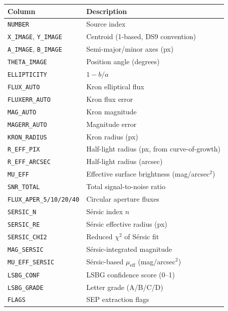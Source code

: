 \documentclass[11pt,fleqn]{book}
\begin{document}
\begin{center}
\begin{longtable}{L{3.5cm} L{9cm}}
\toprule
\textbf{Column} & \textbf{Description} \\
\midrule
\endhead
\texttt{NUMBER} & Source index \\
\texttt{X\_IMAGE}, \texttt{Y\_IMAGE} & Centroid (1-based, DS9 convention) \\
\texttt{A\_IMAGE}, \texttt{B\_IMAGE} & Semi-major/minor axes (px) \\
\texttt{THETA\_IMAGE} & Position angle (degrees) \\
\texttt{ELLIPTICITY} & $1 - b/a$ \\
\midrule
\texttt{FLUX\_AUTO} & Kron elliptical flux \\
\texttt{FLUXERR\_AUTO} & Kron flux error \\
\texttt{MAG\_AUTO} & Kron magnitude \\
\texttt{MAGERR\_AUTO} & Magnitude error \\
\texttt{KRON\_RADIUS} & Kron radius (px) \\
\midrule
\texttt{R\_EFF\_PIX} & Half-light radius (px, from curve-of-growth) \\
\texttt{R\_EFF\_ARCSEC} & Half-light radius (arcsec) \\
\texttt{MU\_EFF} & Effective surface brightness (mag/arcsec$^2$) \\
\texttt{SNR\_TOTAL} & Total signal-to-noise ratio \\
\midrule
\texttt{FLUX\_APER\_5/10/20/40} & Circular aperture fluxes \\
\midrule
\texttt{SERSIC\_N} & S\'ersic index $n$ \\
\texttt{SERSIC\_RE} & S\'ersic effective radius (px) \\
\texttt{SERSIC\_CHI2} & Reduced $\chi^2$ of S\'ersic fit \\
\texttt{MAG\_SERSIC} & S\'ersic-integrated magnitude \\
\texttt{MU\_EFF\_SERSIC} & S\'ersic-based $\mu_\mathrm{eff}$ (mag/arcsec$^2$) \\
\midrule
\texttt{LSBG\_CONF} & LSBG confidence score (0--1) \\
\texttt{LSBG\_GRADE} & Letter grade (A/B/C/D) \\
\texttt{FLAGS} & SEP extraction flags \\
\bottomrule
\end{longtable}
\end{center}
\end{document}
